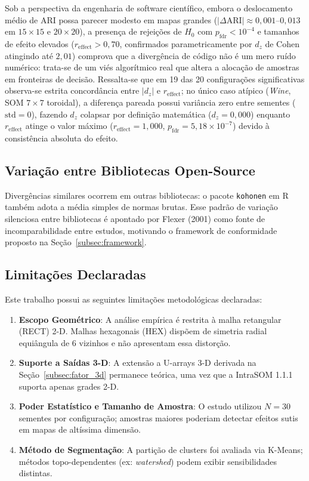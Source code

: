 \documentclass[10pt,journal,compsoc,twocolumn]{IEEEtran}
\begin{document}
Sob a perspectiva da engenharia de software cient\'ifico, embora o deslocamento
m\'edio de ARI possa parecer modesto em mapas grandes ($|\Delta\text{ARI}| \approx 0{,}001$--$0{,}013$
em $15\times15$ e $20\times20$), a presen\c{c}a de rejei\c{c}\~oes de $H_0$ com
$p_\text{fdr} < 10^{-4}$ e tamanhos de efeito elevados ($r_\text{effect} > 0{,}70$,
confirmados parametricamente por $d_z$ de Cohen atingindo at\'e $2{,}01$)
comprova que a diverg\^encia de c\'odigo n\~ao \'e um mero ru\'ido num\'erico:
trata-se de um vi\'es algor\'itmico real que altera a aloca\c{c}\~ao de amostras
em fronteiras de decis\~ao. Ressalta-se que em 19 das 20 configura\c{c}\~oes
significativas observa-se estrita concord\^ancia entre $|d_z|$ e $r_\text{effect}$; no
\'unico caso at\'ipico (\textit{Wine}, SOM $7\times7$ toroidal), a diferen\c{c}a pareada
possui vari\^ancia zero entre sementes ($\text{std}=0$), fazendo $d_z$ colapsar
por defini\c{c}\~ao matem\'atica ($d_z = 0{,}000$) enquanto $r_\text{effect}$ atinge o
valor m\'aximo ($r_\text{effect} = 1{,}000$, $p_\text{fdr} = 5{,}18 \times 10^{-7}$)
devido \`a consist\^encia absoluta do efeito.

\subsection{Varia\c{c}\~ao entre Bibliotecas Open-Source}
Diverg\^encias similares ocorrem em outras bibliotecas: o pacote \texttt{kohonen}
em R \cite{wehrens2007self} tamb\'em adota a m\'edia simples de normas brutas.
Esse padr\~ao de varia\c{c}\~ao silenciosa entre bibliotecas \'e apontado por
Flexer (2001) \cite{flexer2001use} como fonte de incomparabilidade entre estudos,
motivando o framework de conformidade proposto na Se\c{c}\~ao~\ref{subsec:framework}.

\subsection{Limita\c{c}\~oes Declaradas}
\label{subsec:limitacoes}
Este trabalho possui as seguintes limita\c{c}\~oes metodol\'ogicas declaradas:
\begin{enumerate}
    \item \textbf{Escopo Geom\'etrico}: A an\'alise emp\'irica \'e restrita \`a malha
    retangular (RECT) 2-D. Malhas hexagonais (HEX) disp\~oem de simetria radial
    equi\^angula de 6 vizinhos e n\~ao apresentam essa distor\c{c}\~ao.
    \item \textbf{Suporte a Sa\'idas 3-D}: A extens\~ao a U-arrays 3-D derivada na
    Se\c{c}\~ao~\ref{subsec:fator_3d} permanece te\'orica, uma vez que a IntraSOM 1.1.1
    suporta apenas grades 2-D.
    \item \textbf{Poder Estat\'istico e Tamanho de Amostra}: O estudo utilizou
    $N=30$ sementes por configura\c{c}\~ao; amostras maiores poderiam detectar
    efeitos sutis em mapas de alt\'issima dimens\~ao.
    \item \textbf{M\'etodo de Segmenta\c{c}\~ao}: A parti\c{c}\~ao de clusters
    foi avaliada via K-Means; m\'etodos topo-dependentes (ex: \textit{watershed})
    podem exibir sensibilidades distintas.
\end{enumerate}
\end{document}
